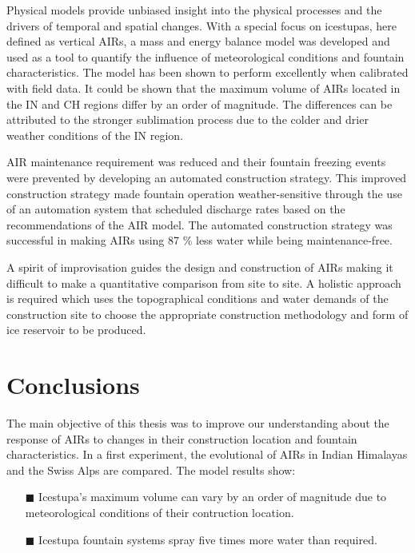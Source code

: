 Physical models provide unbiased insight into the physical processes and the drivers of temporal and spatial
changes. With a special focus on icestupas, here defined as vertical AIRs, a mass and energy balance model was
developed and used as a tool to quantify the influence of meteorological conditions and fountain
characteristics.  The model has been shown to perform excellently when calibrated with field data.  It could be
shown that the maximum volume of AIRs located in the IN and CH regions differ by an order of magnitude. The
differences can be attributed to the stronger sublimation process due to the colder and drier weather conditions
of the IN region. 

AIR maintenance requirement was reduced and their fountain freezing events were prevented by developing an
automated construction strategy. This improved construction strategy made fountain operation weather-sensitive
through the use of an automation system that scheduled discharge rates based on the recommendations of the AIR
model. The automated construction strategy was successful in making AIRs using 87 \% less water while being
maintenance-free.

A spirit of improvisation guides the design and construction of AIRs making it difficult to make a quantitative
comparison from site to site.  A holistic approach is required which uses the topographical conditions and water
demands of the construction site to choose the appropriate construction methodology and form of ice reservoir to
be produced.

\section{Conclusions}

The main objective of this thesis was to improve our understanding about the response of AIRs to changes in
their construction location and fountain characteristics. In a first experiment, the evolutional of AIRs in
Indian Himalayas and the Swiss Alps are compared. The model results show: 

\begin{itemize} 

\item[\tiny{$\blacksquare$}] Icestupa's maximum volume can vary by an order of magnitude due to meteorological
  conditions of their contruction location. 

\item[\tiny{$\blacksquare$}] Icestupa fountain systems spray five times more water than required.

\end{itemize}

